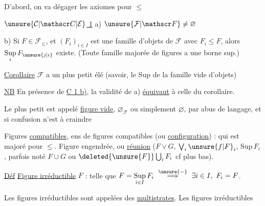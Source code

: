 
D'abord, on va dégager les axiomes pour $\leq$

\uline{$\unsure{\mathcal C|\mathscr C|\mathcal E}$ 1} a) $\unsure{\mathcal F|\mathscr F}\ne\varnothing$

 b) Si $F\in\mathcal F_{\leq}$, et $(F_i)_{i\in I}$ est une famille d'objets de $\mathcal F$ avec $F_i\leq F$, alors $\underset{i}{\mathrm{Sup}}\,F_{\unsure{j|i}}$ existe. (Toute famille majorée de figures a une borne sup.)

\uline{Corollaire} $\mathcal F$ a un plus petit élé (savoir, le $\mathrm{Sup}$ de la famille vide d'objets)

\uline{NB} En présence de  \uline{C 1 b)}, la validité de a) \uline{équivaut} à celle du corollaire.

Le plus petit  est appelé \uline{figure vide},  $\varnothing_{\mathcal F}$ ou simplement $\varnothing$, par abus de langage, et si confusion n'est à craindre



Figures \uline{compatibles}, ens de figures  compatibles   (ou \uline{configuration}) : qui est majoré pour $\leq$.  Figure engendrée, ou \uline{réunion} ($F\vee G$, $\bigvee_i\unsure{f|F}_i$, $\mathrm{Sup}\,F_i$, parfois noté $F\cup G$ ou $\deleted{\unsure{F}}\bigcup_iF_i$ cf plus bas).

\uline{Déf} \uline{Figure irréductible} $F$ : telle que $\displaystyle F=\underset{i\in I}{\mathrm{Sup}}\,F_i\ \overset{\unsure{-}}{\Longrightarrow}\ \exists i\in I,\ F_i=F$.

 Les figures irréductibles sont appelées des \uline{multistrates}.  Les figures irréductibles
